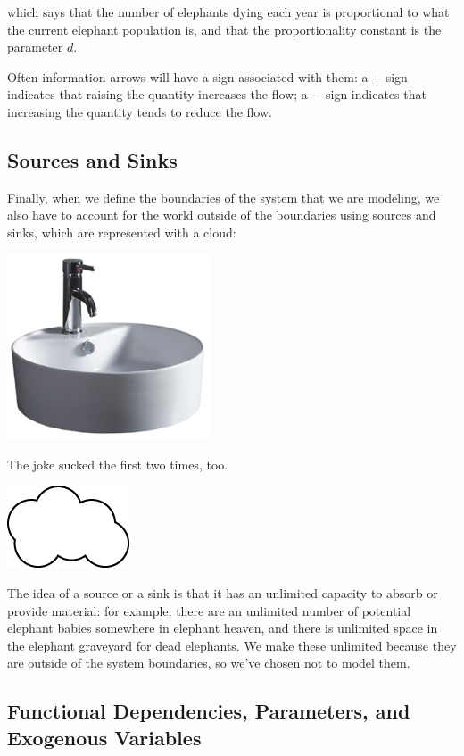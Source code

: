 which says that the number of elephants dying each year is proportional to what the current elephant population is, and that the proportionality constant is the parameter $d$.

Often information arrows will have a sign associated with them: a $+$ sign indicates that raising the quantity increases the flow; a $-$ sign indicates that increasing the quantity tends to reduce the flow.  

\subsection{Sources and Sinks}
Finally, when we define the boundaries of the system that we are modeling, we also have to account for the world outside of the boundaries using sources and sinks, which are represented with a cloud:

\begin{marginfigure}
\includegraphics[width=6cm]{figs/bathroomsink}
\caption{The joke sucked the first two times, too.}
\end{marginfigure}

\beforefig
\centerline{\includegraphics[height=.5in]{figs/sink}}
\afterfig

The idea of a source or a sink is that it has an unlimited capacity to absorb or provide material:  for example, there are an unlimited number of potential elephant babies somewhere in elephant heaven, and there is unlimited space in the elephant graveyard for dead elephants.  We make these unlimited because they are outside of the system boundaries, so we've chosen not to model them.

\subsection{Functional Dependencies, Parameters, and Exogenous Variables}

